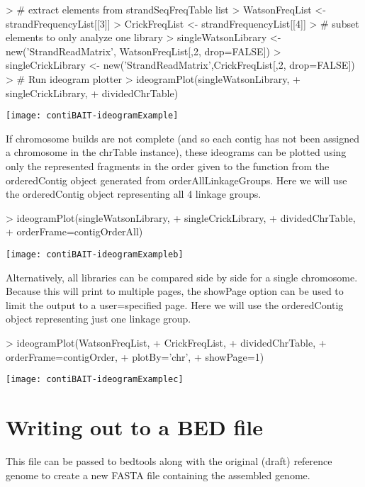 \documentclass{article}
\begin{document}
\begin{Schunk}
\begin{Sinput}
> # extract elements from strandSeqFreqTable list
> WatsonFreqList <- strandFrequencyList[[3]]
> CrickFreqList <- strandFrequencyList[[4]]
> # subset elements to only analyze one library
> singleWatsonLibrary <- new('StrandReadMatrix', WatsonFreqList[,2, drop=FALSE])
> singleCrickLibrary <- new('StrandReadMatrix',CrickFreqList[,2, drop=FALSE]) 
> # Run ideogram plotter
> ideogramPlot(singleWatsonLibrary,
+ singleCrickLibrary,
+ dividedChrTable)
\end{Sinput}
\end{Schunk}
\texttt{[image: contiBAIT-ideogramExample]}

If chromosome builds are not complete (and so each contig has not been assigned a chromosome in the chrTable instance), these ideograms can be plotted using only the represented fragments in the order given to the function from the orderedContig object generated from orderAllLinkageGroups.  Here we will use the orderedContig object representing all 4 linkage groups.

\begin{Schunk}
\begin{Sinput}
> ideogramPlot(singleWatsonLibrary,
+ singleCrickLibrary,
+ dividedChrTable,
+ orderFrame=contigOrderAll)
\end{Sinput}
\end{Schunk}
\texttt{[image: contiBAIT-ideogramExampleb]}

Alternatively, all libraries can be compared side by side for a single chromosome. Because this will print to multiple pages, the showPage option can be used to limit the output to a user=specified page. Here we will use the orderedContig object representing just one linkage group.

\begin{Schunk}
\begin{Sinput}
> ideogramPlot(WatsonFreqList,
+ CrickFreqList,
+ dividedChrTable,
+ orderFrame=contigOrder,
+ plotBy='chr',
+ showPage=1)
\end{Sinput}
\end{Schunk}
\texttt{[image: contiBAIT-ideogramExamplec]}


\section{Writing out to a BED file}
This file can be passed to bedtools along with the original (draft) reference genome to create a new FASTA file containing the assembled genome.
\end{document}
